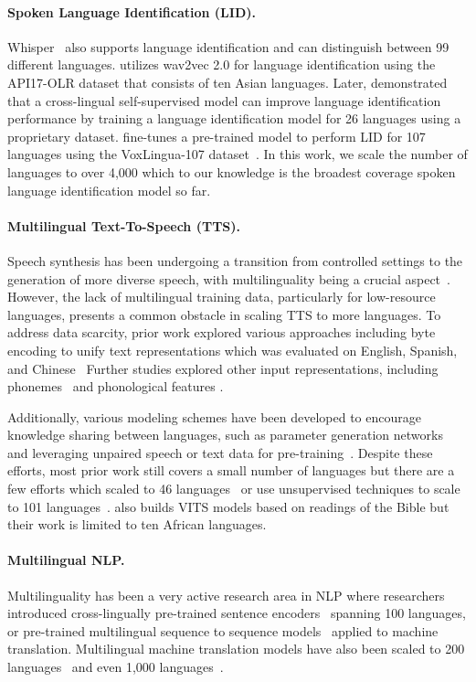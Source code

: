 \paragraph{Spoken Language Identification (LID).}
Whisper~\citep{radford2022whisper} also supports language identification and can distinguish between 99 different languages. 
\citet{fan2021exploring} utilizes wav2vec 2.0 for language identification using the API17-OLR dataset that consists of ten Asian languages. 
Later, \citet{tjandra2022improved} demonstrated that a cross-lingual self-supervised model can improve language identification performance by training a language identification model for 26 languages using a proprietary dataset. 
\citet{babu22_interspeech} fine-tunes a pre-trained model to perform LID for 107 languages using the VoxLingua-107 dataset~\citep{valk2020voxlingua}.  
In this work, we scale the number of languages to over 4,000 which to our knowledge is the broadest coverage spoken language identification model so far.


\paragraph{Multilingual Text-To-Speech (TTS).} 
Speech synthesis has been undergoing a transition from controlled settings to the generation of more diverse speech, with multilinguality being a crucial aspect~\citep{casanova2022yourtts,zhang2023speak}. 
However, the lack of multilingual training data, particularly for low-resource languages, presents a common obstacle in scaling TTS to more languages.
To address data scarcity, prior work explored various approaches including byte encoding to unify text representations which was evaluated on English, Spanish, and Chinese~\citep{li2019bytes}
Further studies explored other input representations, including phonemes~\citep{zhang2019learning} and phonological features \citep{Staib2020Phonological}. 

Additionally, various modeling schemes have been developed to encourage knowledge sharing between languages, such as parameter generation networks~\citep{Nekvinda2020one} and leveraging unpaired speech or text data for pre-training~\citep{Saeki2023Virtuoso,Saeki2023learning}.
Despite these efforts, most prior work still covers a small number of languages but there are a few efforts which scaled to 46 languages~\citep{he2021multi} or use unsupervised techniques to scale to 101 languages~\citep{Saeki2023Virtuoso}. 
\citet{meyer2022bibletts} also builds VITS models based on readings of the Bible but their work is limited to ten African languages.


\paragraph{Multilingual NLP.}
Multilinguality has been a very active research area in NLP where researchers introduced cross-lingually pre-trained sentence encoders~\citep{conneau2019cross} spanning 100 languages, or pre-trained multilingual sequence to sequence models~\citep{liu2020multilingual} applied to machine translation. 
Multilingual machine translation models have also been scaled to 200 languages~\citep{nllbteam2022language} and even 1,000 languages~\citep{bapna2022mt1k}.
